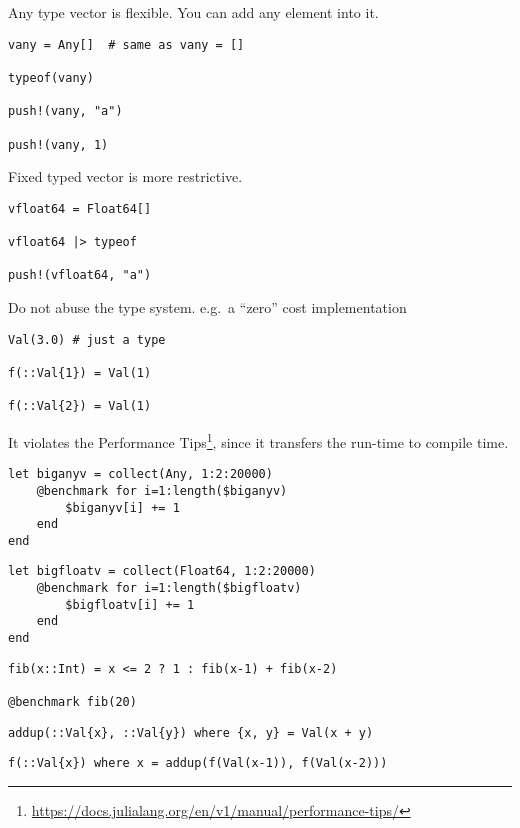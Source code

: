 \documentclass[
  notoc %
]{tufte-book}
\DeclareRobustCommand{\href}[2]{#2\footnote{\url{#1}}}
\begin{document}
Any type vector is flexible. You can add any element into it.

\begin{lstlisting}
vany = Any[]  # same as vany = []

typeof(vany)

push!(vany, "a")

push!(vany, 1)
\end{lstlisting}

Fixed typed vector is more restrictive.

\begin{lstlisting}
vfloat64 = Float64[]

vfloat64 |> typeof

push!(vfloat64, "a")
\end{lstlisting}

Do not abuse the type system. e.g.~a ``zero'' cost implementation

\begin{lstlisting}
Val(3.0) # just a type

f(::Val{1}) = Val(1)

f(::Val{2}) = Val(1)
\end{lstlisting}

It violates the
\href{https://docs.julialang.org/en/v1/manual/performance-tips/}{Performance
Tips}, since it transfers the run-time to compile time.

\begin{lstlisting}
let biganyv = collect(Any, 1:2:20000)
    @benchmark for i=1:length($biganyv)
        $biganyv[i] += 1
    end
end
\end{lstlisting}

\begin{lstlisting}
let bigfloatv = collect(Float64, 1:2:20000)
    @benchmark for i=1:length($bigfloatv)
        $bigfloatv[i] += 1
    end
end
\end{lstlisting}

\begin{lstlisting}
fib(x::Int) = x <= 2 ? 1 : fib(x-1) + fib(x-2)

@benchmark fib(20)
\end{lstlisting}

\begin{lstlisting}
addup(::Val{x}, ::Val{y}) where {x, y} = Val(x + y)
\end{lstlisting}

\begin{lstlisting}
f(::Val{x}) where x = addup(f(Val(x-1)), f(Val(x-2)))
\end{lstlisting}
\end{document}
